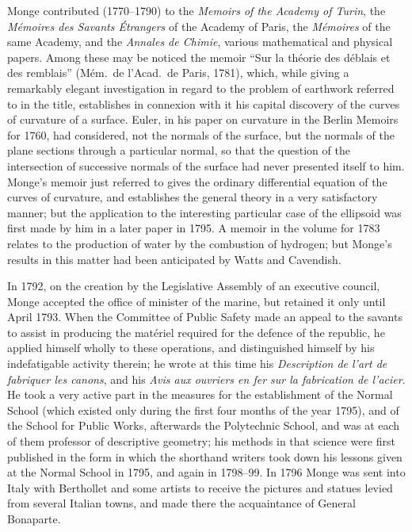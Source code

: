 \documentclass[11pt,a4paper]{book}
\begin{document}
Monge contributed (1770--1790) to the \textit{Memoirs of the Academy of Turin}, the \textit{M\'emoires des Savants \'Etrangers} of the Academy of Paris, the \textit{M\'emoires} of the same Academy, and the \textit{Annales de Chimie}, various mathematical and physical papers. Among these may be noticed the memoir ``Sur la th\'eorie des d\'eblais et des remblais'' (M\'em.\ de l'Acad.\ de Paris, 1781), which, while giving a remarkably elegant investigation in regard to the problem of earthwork referred to in the title, establishes in connexion with it his capital discovery of the curves of curvature of a surface. Euler, in his paper on curvature in the Berlin Memoirs for 1760, had considered, not the normals of the surface, but the normals of the plane sections through a particular normal, so that the question of the intersection of successive normals of the surface had never presented itself to him. Monge's memoir just referred to gives the ordinary differential equation of the curves of curvature, and establishes the general theory in a very satisfactory manner; but the application to the interesting particular case of the ellipsoid was first made by him in a later paper in 1795. A memoir in the volume for 1783 relates to the production of water by the combustion of hydrogen; but Monge's results in this matter had been anticipated by Watts and Cavendish.

In 1792, on the creation by the Legislative Assembly of an executive council, Monge accepted the office of minister of the marine, but retained it only until April 1793. When the Committee of Public Safety made an appeal to the savants to assist in producing the mat\'eriel required for the defence of the republic, he applied himself wholly to these operations, and distinguished himself by his indefatigable activity therein; he wrote at this time his \textit{Description de l'art de fabriquer les canons}, and his \textit{Avis aux ouvriers en fer sur la fabrication de l'acier}. He took a very active part in the measures for the establishment of the Normal School (which existed only during the first four months of the year 1795), and of the School for Public Works, afterwards the Polytechnic School, and was at each of them professor of descriptive geometry; his methods in that science were first published in the form in which the shorthand writers took down his lessons given at the Normal School in 1795, and again in 1798--99. In 1796 Monge was sent into Italy with Berthollet and some artists to receive the pictures and statues levied from several Italian towns, and made there the acquaintance of General Bonaparte.
\end{document}
